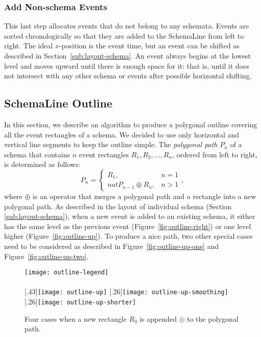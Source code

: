 \subsubsection{Add Non-schema Events}
\label{sub:layout-non-schema}
This last step allocates events that do not belong to any schemata. Events are sorted chronologically so that they are added to the SchemaLine from left to right. The ideal $x$-position is the event time, but an event can be shifted as described in Section~\ref{sub:layout-schema}. An event always begins at the lowest level and moves upward until there is enough space for it: that is, until it does not intersect with any other schema or events after possible horizontal shifting. 

\subsection{SchemaLine Outline}
\label{sub:schema-outline}
In this section, we describe an algorithm to produce a polygonal outline covering all the event rectangles of a schema. We decided to use only horizontal and vertical line segments to keep the outline simple. The \emph{polygonal path} $P_n$ of a schema that contains $n$ event rectangles $R_1, R_2, ..., R_n$, ordered from left to right, is determined as follows:
\[
P_n=
\begin{cases}
R_1, & n=1 \\nat
P_{n-1} \oplus R_n, & n > 1
\end{cases},
\]
where $\oplus$ is an operator that merges a polygonal path and a rectangle into a new polygonal path. As described in the layout of individual schema (Section \ref{sub:layout-schema}), when a new event is added to an existing schema, it either has the same level as the previous event (Figure~\ref{fig:outline-right}) or one level higher (Figure~\ref{fig:outline-up}). To produce a nice path, two other special cases need to be considered as described in Figure~\ref{fig:outline-up-one} and Figure~\ref{fig:outline-up-two}.

\begin{figure}[!htb]
	\centering
	\texttt{[image: outline-legend]}\bigskip\\
	\\
	[.43\linewidth]{\texttt{[image: outline-up]}}
	\hfill
	[.26\linewidth]{\texttt{[image: outline-up-smoothing]}}
	\hfill
	[.26\linewidth]{\texttt{[image: outline-up-shorter]}}
	\caption{Four cases when a new rectangle \colorbox{f2!40}{$R_3$} is appended \textcolor{ForestGreen}{$\pmb{\oplus}$} to the polygonal path.}
	\label{fig:sl-outline}
\end{figure}

